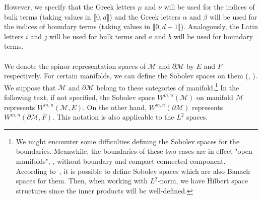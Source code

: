 However, we specify that the Greek letters $\mu$ and $\nu$ will be used for the indices of bulk terms (taking values in $\llbracket 0, d \rrbracket$) and the Greek letters $\alpha$ and $\beta$ will be used for the indices of boundary terms (taking values in $\llbracket 0, d-1 \rrbracket$).
Analogously, the Latin letters $i $ and $j$ will be used for bulk terms and $a$ and $b$ will be used for boundary terms. \\\\
%
We denote the spinor representation spaces of $\mathcal{M}$ and $\partial \mathcal{M}$ by $E$ and $F$ respectively.
For certain manifolds, we can define the Sobolev spaces on them (\cite{Hebey1996}, \cite{Eichhorn1996}).
We suppose that $\mathcal{M}$ and $\partial\mathcal{M}$ belong to these categories of manifold.\footnote{
We might encounter some difficulties defining the Sobolev spaces for the boundaries. Meanwhile, the boundaries of these two cases are in effect "open manifolds", \ie, without boundary and compact connected component. 
According to~\cite{Eichhorn1996}, it is possible to define Sobolev spaces which are also Banach spaces for them.
Then, when working with $L^2$-norm, we have Hilbert space structures since the inner products will be well-defined.  
}
In the following text, if not specified, the Sobolev space $W^{m,n}(\mathcal{M})$ on manifold $\mathcal{M}$ represents $W^{m,n}(\mathcal{M}, E)$.
On the other hand, $W^{m,n}(\partial \mathcal{M})$ represents $W^{m,n}(\partial \mathcal{M}, F)$.
This notation is also applicable to the $L^2$ spaces.
%
